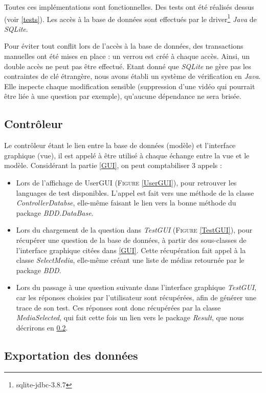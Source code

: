 Toutes ces implémentations sont fonctionnelles. Des tests ont été réalisés dessus (voir \ref{tests}).
Les accès à la base de données sont effectués par le driver\footnote{sqlite-jdbc-3.8.7} \textit{Java} de \textit{SQLite}.

Pour éviter tout conflit lors de l'accès à la base de données, des transactions manuelles ont été mises en place : un verrou est créé à chaque accès. Ainsi, un double accès ne peut pas être effectué.
Etant donné que \textit{SQLite} ne gère pas les contraintes de clé étrangère, nous avons établi un système de vérification en \textit{Java}. Elle inspecte chaque modification sensible (suppression d'une vidéo qui pourrait être liée à une question par exemple), qu'aucune dépendance ne sera brisée.


\subsection{Contrôleur}\label{controller}


Le contrôleur étant le lien entre la base de données (modèle) et l'interface graphique (vue), il est appelé à être utilisé à chaque échange entre la vue et le modèle.
Considérant la partie \ref{GUI}, on peut comptabiliser 3 appels :

\begin{itemize}
 \item Lors de l'affichage de UserGUI (\textsc{Figure} \ref{UserGUI}), pour retrouver les languages de test disponibles. L'appel est fait vers une méthode de la classe \textit{ControllerDatabse}, elle-même faisant le lien vers la bonne méthode du package \textit{BDD.DataBase}.
 \item Lors du chargement de la question dans \textit{TestGUI} (\textsc{Figure} \ref{TestGUI}), pour récupérer une question de la base de données, à partir des sous-classes de l'interface graphique citées dans \ref{GUI}. Cette récupération fait appel à la classe \textit{SelectMedia}, elle-même créant une liste de médias retournée par le package \textit{BDD}.
 \item Lors du passage à une question suivante dans l'interface graphique \textit{TestGUI}, car les réponses choisies par l'utilisateur sont récupérées, afin de générer une trace de son test. Ces réponses sont donc récupérées par la classe \textit{MediaSelected}, qui fait cette fois un lien vers le package \textit{Result}, que nous décrirons en \ref{export}.
\end{itemize}


\subsection{Exportation des données}\label{export}

